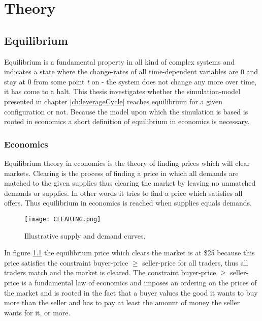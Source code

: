 \documentclass[../Bachelorarbeit.tex]{subfiles}
\begin{document}
\graphicspath{{./figures/theory/}}	%

\chapter{Theory}
\label{ch:theory}

\section{Equilibrium}
Equilibrium is a fundamental property in all kind of complex systems and indicates a state where the change-rates of all time-dependent variables are 0 and stay at 0 from some point \textit{t} on - the system does not change any more over time, it has come to a halt. This thesis investigates whether the simulation-model presented in chapter \ref{ch:leverageCycle} reaches equilibrium for a given configuration or not. Because the model upon which the simulation is based is rooted in economics a short definition of equilibrium in economics is necessary.

\subsection{Economics}
Equilibrium theory in economics is the theory of finding prices which will clear markets. Clearing is the process of finding a price in which all demands are matched to the given supplies thus clearing the market by leaving no unmatched demands or supplies. In other words it tries to find a price which satisfies all offers. Thus equilibrium in economics is reached when supplies equals demands.

\begin{figure}[H]
	\centering
  \texttt{[image: CLEARING.png]}
  	\caption{Illustrative supply and demand curves. \cite{Parsons2006}}
	\label{fig:CLEARING}
\end{figure}

In figure \ref{fig:CLEARING} the equilibrium price which clears the market is at \$25 because this price satisfies the constraint buyer-price $\geq$ seller-price for all traders, thus all traders match and the market is cleared. The constraint buyer-price $\geq$ seller-price is a fundamental law of economics and imposes an ordering on the prices of the market and is rooted in the fact that a buyer values the good it wants to buy more than the seller and has to pay at least the amount of money the seller wants for it, or more. 
\end{document}
